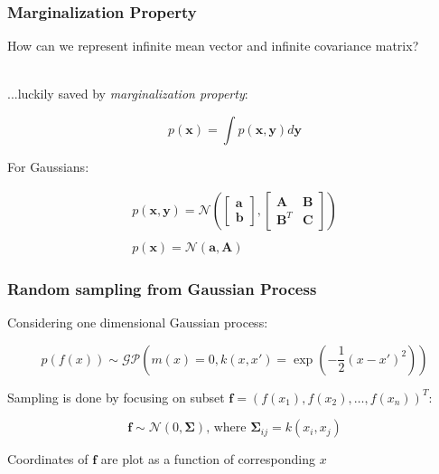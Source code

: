 \documentclass[10pt]{beamer}
\newcommand{\bx}{\mathbf{x}}
\newcommand{\by}{\mathbf{y}}
\newcommand{\ba}{\mathbf{a}}
\newcommand{\bb}{\mathbf{b}}
\newcommand{\boldf}{\mathbf{f}}
\newcommand{\bA}{\mathbf{A}}
\newcommand{\bB}{\mathbf{B}}
\newcommand{\bC}{\mathbf{C}}
\newcommand{\gp}{\mathcal{GP}}
\newcommand{\gaussN}{\mathcal{N}}
\newcommand{\bSig}{\boldsymbol{\Sigma}}
\begin{document}
  \begin{frame}
    \frametitle{Marginalization Property}
    How can we represent infinite mean vector and infinite covariance matrix? \\~

    ...luckily saved by \emph{marginalization property}:

    \begin{equation*}
      p(\bx) = \int p(\bx,\by)d \by
    \end{equation*}

    For Gaussians:

    \begin{equation*}
      \begin{array}{c}
        p(\bx, \by) = \gaussN \left(\begin{bmatrix} \ba \\ \bb \end{bmatrix}, \begin{bmatrix} \bA & \bB \\ \bB^T & \bC \end{bmatrix} \right) \\~\\
        p(\bx) = \gaussN(\ba,\bA)
      \end{array}
    \end{equation*}
  \end{frame}

  \begin{frame}
    \frametitle{Random sampling from Gaussian Process}
    Considering one dimensional Gaussian process:

    \begin{equation*}
      p(f(x)) \sim \gp \left( m(x) = 0, k(x,x') = \exp \left( - \frac{1}{2} (x - x')^2 \right) \right)
    \end{equation*}

    Sampling is done by focusing on subset $\boldf = (f(x_1), f(x_2),\dots,f(x_n))^T$:

    \begin{equation*}
      \boldf \sim \gaussN(0,\bSig) \text{, where } \bSig_{ij} = k(x_i,x_j)
    \end{equation*}

    Coordinates of $\boldf$ are plot as a function of corresponding $x$
  \end{frame}
\end{document}
